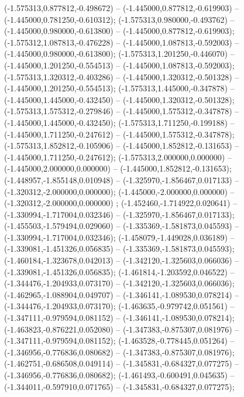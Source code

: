  (-1.575313,0.877812,-0.498672) -- (-1.445000,0.877812,-0.619903) -- (-1.445000,0.781250,-0.610312);
 (-1.575313,0.980000,-0.493762) -- (-1.445000,0.980000,-0.613800) -- (-1.445000,0.877812,-0.619903);
 (-1.575312,1.087813,-0.476228) -- (-1.445000,1.087813,-0.592003) -- (-1.445000,0.980000,-0.613800);
 (-1.575313,1.201250,-0.446070) -- (-1.445000,1.201250,-0.554513) -- (-1.445000,1.087813,-0.592003);
 (-1.575313,1.320312,-0.403286) -- (-1.445000,1.320312,-0.501328) -- (-1.445000,1.201250,-0.554513);
 (-1.575313,1.445000,-0.347878) -- (-1.445000,1.445000,-0.432450) -- (-1.445000,1.320312,-0.501328);
 (-1.575313,1.575312,-0.279846) -- (-1.445000,1.575312,-0.347878) -- (-1.445000,1.445000,-0.432450);
 (-1.575313,1.711250,-0.199188) -- (-1.445000,1.711250,-0.247612) -- (-1.445000,1.575312,-0.347878);
 (-1.575313,1.852812,-0.105906) -- (-1.445000,1.852812,-0.131653) -- (-1.445000,1.711250,-0.247612);
 (-1.575313,2.000000,0.000000) -- (-1.445000,2.000000,0.000000) -- (-1.445000,1.852812,-0.131653);
 (-1.448957,-1.855148,0.010948) -- (-1.325970,-1.856467,0.017133) -- (-1.320312,-2.000000,0.000000);
 (-1.445000,-2.000000,0.000000) -- (-1.320312,-2.000000,0.000000) ;
 (-1.452460,-1.714922,0.020641) -- (-1.330994,-1.717004,0.032346) -- (-1.325970,-1.856467,0.017133);
 (-1.455503,-1.579494,0.029060) -- (-1.335369,-1.581873,0.045593) -- (-1.330994,-1.717004,0.032346);
 (-1.458079,-1.449028,0.036189) -- (-1.339081,-1.451326,0.056835) -- (-1.335369,-1.581873,0.045593);
 (-1.460184,-1.323678,0.042013) -- (-1.342120,-1.325603,0.066036) -- (-1.339081,-1.451326,0.056835);
 (-1.461814,-1.203592,0.046522) -- (-1.344476,-1.204933,0.073170) -- (-1.342120,-1.325603,0.066036);
 (-1.462965,-1.088904,0.049707) -- (-1.346141,-1.089530,0.078214) -- (-1.344476,-1.204933,0.073170);
 (-1.463635,-0.979742,0.051561) -- (-1.347111,-0.979594,0.081152) -- (-1.346141,-1.089530,0.078214);
 (-1.463823,-0.876221,0.052080) -- (-1.347383,-0.875307,0.081976) -- (-1.347111,-0.979594,0.081152);
 (-1.463528,-0.778445,0.051264) -- (-1.346956,-0.776836,0.080682) -- (-1.347383,-0.875307,0.081976);
 (-1.462751,-0.686508,0.049114) -- (-1.345831,-0.684327,0.077275) -- (-1.346956,-0.776836,0.080682);
 (-1.461493,-0.600491,0.045635) -- (-1.344011,-0.597910,0.071765) -- (-1.345831,-0.684327,0.077275);
